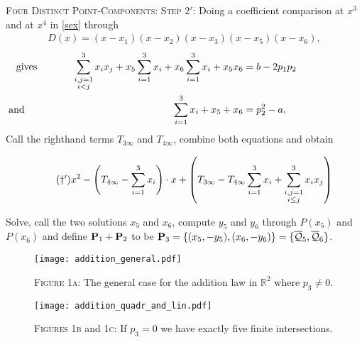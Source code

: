\documentclass[english,11pt,a4paper]{article}
\begin{document}
\begin{case} {\scshape Four Distinct Point-Components:}
  {\scshape Step $2'$:} Doing a coefficient comparison at $x^3$ and at $x^4$ in \eqref{sex} through
  \begin{align*}\tag{$*_1'$}
    D(x) = (x-x_1)(x-x_2)(x-x_3)(x-x_5)(x-x_6),
  \end{align*}\vspace{-8mm}
  \begin{align*}
    \rlap{\hspace{-21.2mm} gives}
    \sum_{\substack{i,j=1\\i<j}}^3 x_i x_j + x_5\sum_{i=1}^3 x_i + x_6\sum_{i=1}^3 x_i + x_5 x_6 &= b-2p_1 p_2\\
    \rlap{\hspace{-59.3mm} and}
    \sum_{i=1}^3 x_i + x_5 + x_6 &= p_2^2-a.
  \end{align*}
  Call the righthand terms $T_{3\infty}$ and $T_{4\infty}$, combine both equations and obtain

  \vspace{-2mm}
  \fline
  \begin{align*}
    \label{daggerp} \tag{$\dagger '$} x^2 - \left( T_{4\infty} - \sumthr \right) \cdot x + \left(T_{3\infty} - T_{4\infty} \sumthr + \sum_{\substack{i,j=1\\i\leq j}}^3 x_i x_j \right)
  \end{align*}
  \fline

  Solve, call the two solutions $x_5$ and $x_6$, compute $y_5$ and $y_6$ through $P(x_5)$ and $P(x_6)$ and define $\P_1+\P_2$ to be $\P_3=\{ (x_5,-y_5) , (x_6,-y_6) \}=\{ \bar \q_5, \bar \q_6 \}$.
\end{case}


\begin{figure}[ht!]
  \fline
  \begin{center}
    \vspace{1mm}
    \texttt{[image: addition\_general.pdf]}

    {\scshape Figure 1a}: The general case for the addition law in $\mathds{R}^2$ where $p_3 \neq 0$.

    \vspace{1mm}

    \texttt{[image: addition\_quadr\_and\_lin.pdf]}

    {\scshape Figures 1b} and {\scshape 1c}: If $p_3 = 0$ we have exactly five finite intersections.
  \end{center}
  \vspace{-1.5mm}
  \fline
\end{figure}
\end{document}
